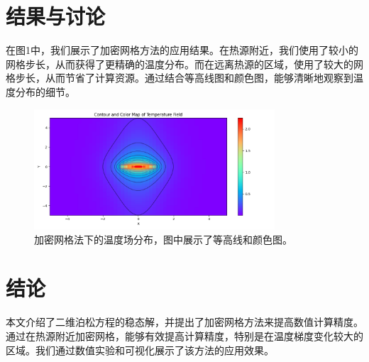 \section{结果与讨论}
在图1中，我们展示了加密网格方法的应用结果。在热源附近，我们使用了较小的网格步长，从而获得了更精确的温度分布。而在远离热源的区域，使用了较大的网格步长，从而节省了计算资源。通过结合等高线图和颜色图，能够清晰地观察到温度分布的细节。

\begin{figure}[h!]
    \centering
    \includegraphics[width=0.8\textwidth]{temperature.png}
    \caption{加密网格法下的温度场分布，图中展示了等高线和颜色图。}
    \label{fig:temperature_field}
\end{figure}

\section{结论}
本文介绍了二维泊松方程的稳态解，并提出了加密网格方法来提高数值计算精度。通过在热源附近加密网格，能够有效提高计算精度，特别是在温度梯度变化较大的区域。我们通过数值实验和可视化展示了该方法的应用效果。

